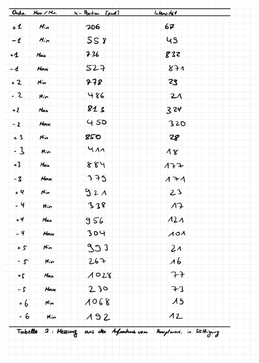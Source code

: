 \documentclass{article}
\begin{document}
\includegraphics[width=\textwidth]{graphics/messprotokoll/233 - Fourieroptik-6.jpg}
\newpage
\end{document}
